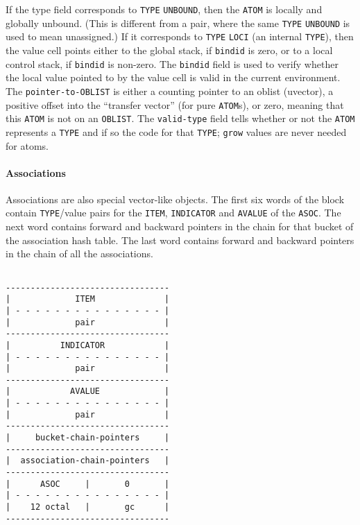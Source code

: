 \documentclass[a4paper,]{article}
\let\oldparagraph\paragraph
\renewcommand{\paragraph}[1]{\oldparagraph{#1}\mbox{}}
\begin{document}
If the type field corresponds to \texttt{TYPE} \texttt{UNBOUND}, then the \texttt{ATOM} is locally
and globally unbound. (This is different from a pair, where the same \texttt{TYPE} \texttt{UNBOUND} is used to mean
unassigned.) If it corresponds to \texttt{TYPE} \texttt{LOCI} (an internal \texttt{TYPE}), then the value cell points
either to the global stack, if \texttt{bindid} is zero, or to a local control stack, if \texttt{bindid} is non-zero. The
\texttt{bindid} field is used to verify whether the local value pointed to by the value cell is valid in the current
environment. The \texttt{pointer-to-OBLIST} is either a counting pointer to an oblist (uvector), a positive offset into the
``transfer vector'' (for pure \texttt{ATOM}s), or zero, meaning that this \texttt{ATOM} is not on an \texttt{OBLIST}. The
\texttt{valid-type} field tells whether or not the \texttt{ATOM} represents a \texttt{TYPE} and if so the code for that
\texttt{TYPE}; \texttt{grow} values are never needed for atoms.

\paragraph{Associations}\label{associations}

Associations are also special vector-like objects. The first six words of the block contain \texttt{TYPE}/value pairs for
the \texttt{ITEM}, \texttt{INDICATOR} and \texttt{AVALUE} of the \texttt{ASOC}. The next word contains forward and backward
pointers in the chain for that bucket of the association hash table. The last word contains forward and backward pointers
in the chain of all the associations.

\begin{verbatim}

---------------------------------
|             ITEM              |
| - - - - - - - - - - - - - - - |
|             pair              |
---------------------------------
|          INDICATOR            |
| - - - - - - - - - - - - - - - |
|             pair              |
---------------------------------
|            AVALUE             |
| - - - - - - - - - - - - - - - |
|             pair              |
---------------------------------
|     bucket-chain-pointers     |
---------------------------------
|  association-chain-pointers   |
---------------------------------
|      ASOC     |       0       |
| - - - - - - - - - - - - - - - |
|    12 octal   |       gc      |
---------------------------------
\end{verbatim}
\end{document}

